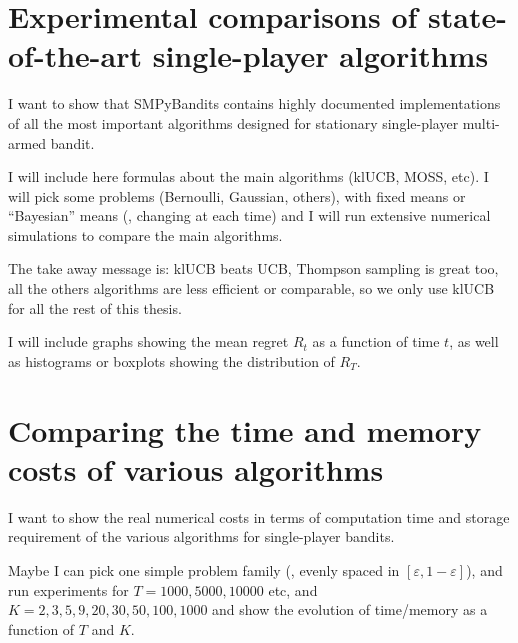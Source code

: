 \section{Experimental comparisons of state-of-the-art single-player algorithms}
\label{sec:3:reviewSPAlgorithms}


I want to show that SMPyBandits contains highly documented implementations of all the most important algorithms designed for stationary single-player multi-armed bandit.

I will include here formulas about the main algorithms (klUCB, MOSS, etc).
I will pick some problems (Bernoulli, Gaussian, others), with fixed means or ``Bayesian'' means (\ie, changing at each time) and I will run extensive numerical simulations to compare the main algorithms.

The take away message is: klUCB beats UCB, Thompson sampling is great too, all the others algorithms are less efficient or comparable, so we only use klUCB for all the rest of this thesis.

I will include graphs showing the mean regret $R_t$ as a function of time $t$, as well as histograms or boxplots showing the distribution of $R_T$.


\section{Comparing the time and memory costs of various algorithms}
\label{sec:3:timeAndMemoryCosts}


I want to show the real numerical costs in terms of computation time and storage requirement of the various algorithms for single-player bandits.

Maybe I can pick one simple problem family (\eg, evenly spaced in $[\varepsilon,1-\varepsilon]$), and run experiments for $T=1000,5000,10000$ etc, and $K=2,3,5,9,20,30,50,100,1000$ and show the evolution of time/memory as a function of $T$ and $K$.

